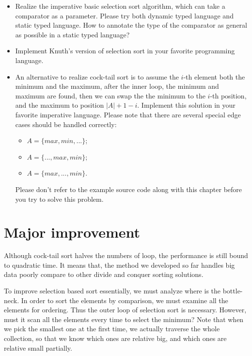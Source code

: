 \documentclass[UTF8]{article}
\begin{document}
\begin{Exercise}
  \begin{itemize}
    \item Realize the imperative basic selection sort algorithm, which can take a comparator as a parameter. Please try both dynamic typed language and static typed language. How to annotate the type of the comparator as general as possible in a static typed language?
   \item Implement Knuth's version of selection sort in your favorite programming language.
   \item An alternative to realize cock-tail sort is to assume the $i$-th element both the minimum and the maximum, after the inner loop, the minimum and maximum are found, then we can swap the the minimum to the $i$-th position, and
the maximum to position $|A|+1-i$. Implement this solution in your favorite imperative language. Please note that
there are several special edge cases should be handled correctly:
    \begin{itemize}
      \item $A = \{max, min, ...\}$;
      \item $A = \{..., max, min\}$;
      \item $A = \{max, ..., min\}$.
    \end{itemize}
    Please don't refer to the example source code along with this chapter before you try to solve this problem.
  \end{itemize}
\end{Exercise}


\section{Major improvement}

Although cock-tail sort halves the numbers of loop, the performance is still bound to quadratic time.
It means that, the method we developed so far handles big data poorly compare to other divide and conquer
sorting solutions.

To improve selection based sort essentially, we must analyze where is the bottle-neck. In order to sort
the elements by comparison, we must examine all the elements for ordering. Thus the outer loop of selection
sort is necessary. However, must it scan all the elements every time to select the minimum? Note that
when we pick the smallest one at the first time, we actually traverse the whole collection, so that
we know which ones are relative big, and which ones are relative small partially.
\end{document}
